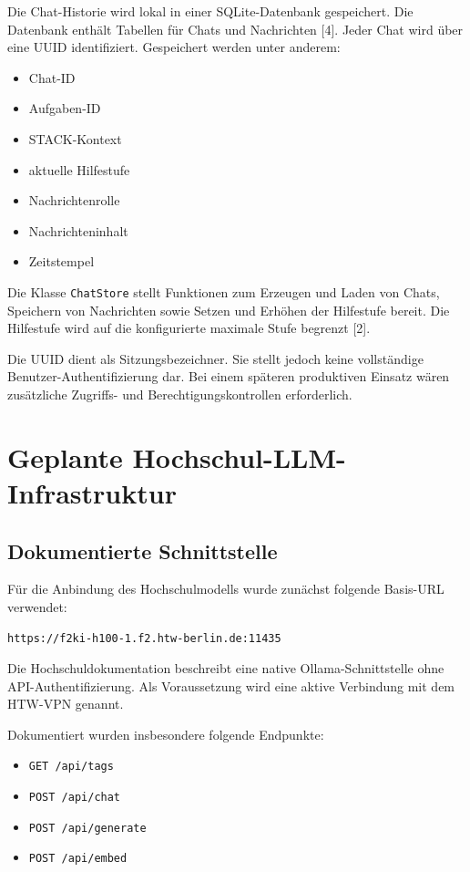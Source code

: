 \documentclass[11pt,a4paper,oneside,ngerman]{memoir}
\begin{document}
Die Chat-Historie wird lokal in einer SQLite-Datenbank gespeichert. Die Datenbank enthält Tabellen für Chats und Nachrichten [4]. Jeder Chat wird über eine UUID identifiziert. Gespeichert werden unter anderem:

\begin{itemize}
    \item Chat-ID
    \item Aufgaben-ID
    \item STACK-Kontext
    \item aktuelle Hilfestufe
    \item Nachrichtenrolle
    \item Nachrichteninhalt
    \item Zeitstempel
\end{itemize}

Die Klasse \texttt{ChatStore} stellt Funktionen zum Erzeugen und Laden von Chats, Speichern von Nachrichten sowie Setzen und Erhöhen der Hilfestufe bereit. Die Hilfestufe wird auf die konfigurierte maximale Stufe begrenzt [2].

Die UUID dient als Sitzungsbezeichner. Sie stellt jedoch keine vollständige Benutzer-Authentifizierung dar. Bei einem späteren produktiven Einsatz wären zusätzliche Zugriffs- und Berechtigungskontrollen erforderlich.

\chapter{Geplante Hochschul-LLM-Infrastruktur}

\section{Dokumentierte Schnittstelle}

Für die Anbindung des Hochschulmodells wurde zunächst folgende Basis-URL verwendet:

\begin{verbatim}
https://f2ki-h100-1.f2.htw-berlin.de:11435
\end{verbatim}

Die Hochschuldokumentation beschreibt eine native Ollama-Schnittstelle ohne API-Authentifizierung. Als Voraussetzung wird eine aktive Verbindung mit dem HTW-VPN genannt.

Dokumentiert wurden insbesondere folgende Endpunkte:

\begin{itemize}
    \item \texttt{GET /api/tags}
    \item \texttt{POST /api/chat}
    \item \texttt{POST /api/generate}
    \item \texttt{POST /api/embed}
\end{itemize}
\end{document}
